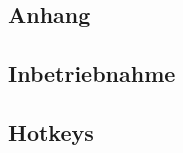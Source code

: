 \appendix
{}

\begin{Spacing}{\mylinespace}
	\renewcommand\thechapter{}
	\chapter{Anhang}
	\renewcommand{\thechapter}{A}
	
	\section{Inbetriebnahme}
	\section{Hotkeys}
	
\end{Spacing}
\newpage
\clearpage
